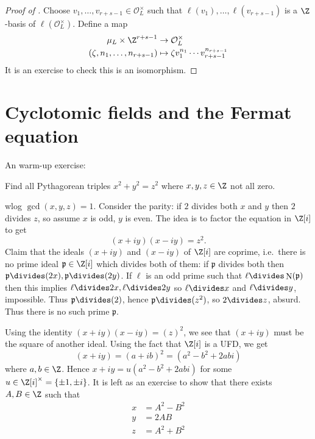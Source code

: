 \documentclass[a4paper]{article}
\renewcommand*{\O}{\mathcal{O}}
\DeclareMathOperator{\n}{N}
\begin{document}
\begin{proof}[Proof of ]
  Choose \(v_1, \dots, v_{r + s - 1} \in \O_L^\times\) such that \(\ell(v_1), \dots, \ell(v_{r + s - 1})\) is a \(\Z\)-basis of \(\ell(\O_L^\times)\). Define a map
  \begin{align*}
    \mu_L \times \Z^{r + s - 1} &\to \O_L^\times \\
    (\zeta, n_1, \dots, n_{r + s - 1}) &\mapsto \zeta v_1^{n_1} \cdots v_{r + s - 1}^{n_{r + s - 1}}
  \end{align*}
  It is an exercise to check this is an isomorphism.
\end{proof}

\section{Cyclotomic fields and the Fermat equation}

An warm-up exercise:

\begin{question}
  Find all Pythagorean triples \(x^2 + y^2 = z^2\) where \(x, y, z \in \Z\) not all zero.
\end{question}

wlog \(\gcd(x, y, z) = 1\). Consider the parity: if \(2\) divides both \(x\) and \(y\) then \(2\) divides \(z\), so assume \(x\) is odd, \(y\) is even. The idea is to factor the equation in \(\Z[i]\) to get
\[
  (x + iy)(x - iy) = z^2.
\]
Claim that the ideals \((x + iy)\) and \((x - iy)\) of \(\Z[i]\) are coprime, i.e.\ there is no prime ideal \(\mathfrak p \in \Z[i]\) which divides both of them: if \(\mathfrak p\) divides both then \(\mathfrak p \divides (2x), \mathfrak p \divides (2y)\). If \(\ell\) is an odd prime such that \(\ell \divides \n(\mathfrak p)\) then this implies \(\ell \divides 2x, \ell \divides 2y\) so \(\ell \divides x\) and \(\ell \divides y\), impossible. Thus \(\mathfrak p \divides (2)\), hence \(\mathfrak p \divides (z^2)\), so \(2 \divides z\), absurd. Thus there is no such prime \(\mathfrak p\).

Using the identity \((x + iy)(x - iy) = (z)^2\), we see that \((x + iy)\) must be the square of another ideal. Using the fact that \(\Z[i]\) is a UFD, we get
\[
  (x + iy) = (a + ib)^2 = (a^2 - b^2 + 2ab i)
\]
where \(a, b \in \Z\). Hence \(x + iy = u(a^2 - b^2 + 2abi)\) for some \(u \in \Z[i]^\times = \{\pm 1, \pm i\}\). It is left as an exercise to show that there exists \(A, B \in \Z\) such that
\begin{align*}
  x &= A^2 - B^2 \\
  y &= 2AB \\
  z &= A^2 + B^2
\end{align*}
\end{document}
